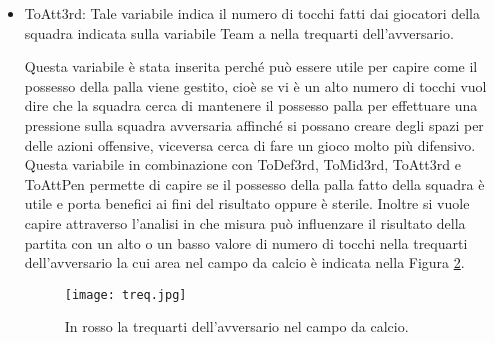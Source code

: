 \begin{itemize}
	Questa variabile è stata inserita perché può essere utile per capire come il possesso palla viene gestito, cioè se vi è un alto numero di tocchi vuol dire che la squadra cerca di mantenere il possesso palla cercando di creare delle azioni offensive, viceversa cerca di fare un gioco più difensivo. Questa variabile in combinazione con \textsf{ToDef3rd}, \textsf{ToMid3rd}, \textsf{ToAtt3rd} e \textsf{ToAttPen} permette di capire se il possesso della palla fatto dalla squadra è utile e porta benefici ai fini del risultato oppure è sterile. Inoltre si vuole capire attraverso l'analisi in che misura può influenzare il risultato della partita con un alto o un basso valore di numero di tocchi a centrocampo la cui area nel campo da calcio è indicata nella Figura \ref{fig:cen}.
	
		\begin{figure}[!ht]
		\begin{center}
			\texttt{[image: cen.jpg]}
			\caption{In rosso il centrocampo nel campo da calcio.} 
			\label{fig:cen}
		\end{center}
	\end{figure}

	\item \textsf{ToAtt3rd}: Tale variabile indica il numero di tocchi fatti dai giocatori della squadra indicata sulla variabile \textsf{Team} a nella trequarti dell'avversario. 
	
	Questa variabile è stata inserita perché può essere utile per capire come il possesso della palla viene gestito, cioè se vi è un alto numero di tocchi vuol dire che la squadra cerca di mantenere il possesso palla per effettuare una pressione sulla squadra avversaria affinché si possano creare degli spazi per delle azioni offensive, viceversa cerca di fare un gioco molto più difensivo. Questa variabile in combinazione con \textsf{ToDef3rd}, \textsf{ToMid3rd}, \textsf{ToAtt3rd} e \textsf{ToAttPen} permette di capire se il possesso della palla fatto della squadra è utile e porta benefici ai fini del risultato oppure è sterile. Inoltre si vuole capire attraverso l'analisi in che misura può influenzare il risultato della partita con un alto o un basso valore di numero di tocchi nella trequarti dell'avversario la cui area nel campo da calcio è indicata nella Figura \ref{fig:treq}.
	
		\begin{figure}[!ht]
		\begin{center}
			\texttt{[image: treq.jpg]}
			\caption{In rosso la trequarti dell'avversario nel campo da calcio.} 
			\label{fig:treq}
		\end{center}
	\end{figure}


\end{itemize}
